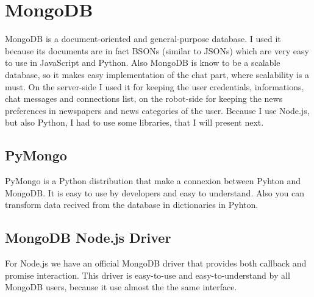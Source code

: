 \section{MongoDB}
\label{sec:mongo}
MongoDB \cite{chodorow2013mongodb} is a document-oriented and general-purpose database. I used it because
its documents are in fact BSONs (similar to JSONs) which are very easy to use in JavaScript and Python.
Also MongoDB is know to be a scalable database, so it makes easy implementation of
the chat part, where scalability is a must. On the server-side I used it for keeping
the user credentials, informations, chat messages and connections list, on the robot-side
for keeping the news preferences in newspapers and news categories of the user. Because I use Node.js,
but also Python, I had to use some libraries, that I will present next.
\subsection{PyMongo}
\label{sub-sec:mongo-py}
PyMongo is a Python distribution that make a connexion between Pyhton and MongoDB. It is easy to use by
developers and easy to understand. Also you can transform data recived from the database in dictionaries
in Pyhton.
\subsection{MongoDB Node.js Driver}
\label{sub-sec:mongo-node}
For Node.js we have an official MongoDB driver that provides both callback and promise interaction.
This driver is easy-to-use and easy-to-understand by all MongoDB users, because it use almost the
the same interface.

